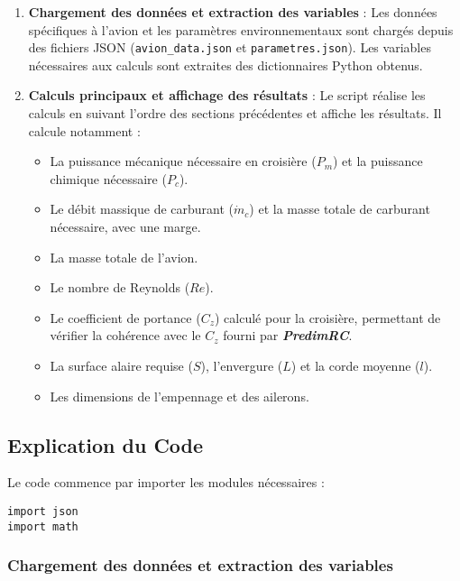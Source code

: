\documentclass[12pt,a4paper]{article}
\begin{document}
\begin{enumerate}[label=\arabic*.]
    \item \textbf{Chargement des données et extraction des variables} : Les données spécifiques à l'avion et les paramètres environnementaux sont chargés depuis des fichiers JSON (\texttt{avion\_data.json} et \texttt{parametres.json}). Les variables nécessaires aux calculs sont extraites des dictionnaires Python obtenus.
    
    \item \textbf{Calculs principaux et affichage des résultats} : Le script réalise les calculs en suivant l'ordre des sections précédentes et affiche les résultats. Il calcule notamment :
    \begin{itemize}
        \item La puissance mécanique nécessaire en croisière ($P_m$) et la puissance chimique nécessaire ($P_c$).
        \item Le débit massique de carburant ($\dot{m}_c$) et la masse totale de carburant nécessaire, avec une marge.
        \item La masse totale de l'avion.
        \item Le nombre de Reynolds ($Re$).
        \item Le coefficient de portance ($C_z$) calculé pour la croisière, permettant de vérifier la cohérence avec le $C_z$ fourni par \textit{\textbf{PredimRC}}.
        \item La surface alaire requise ($S$), l'envergure ($L$) et la corde moyenne ($l$).
        \item Les dimensions de l'empennage et des ailerons.
    \end{itemize}
\end{enumerate}

\subsection{Explication du Code}

Le code commence par importer les modules nécessaires :

\begin{verbatim}
import json
import math
\end{verbatim}

\subsubsection{Chargement des données et extraction des variables}
\end{document}
